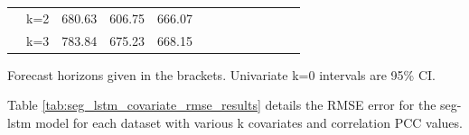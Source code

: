 \documentclass{article}
\begin{document}
\begin{table}[tbp]
\begin{threeparttable}
\begin{small}
\begin{tabular}{c|c|ccccccccccc}
    & k=2 & 680.63 & 606.75 & 666.07 \\ 
    & k=3 & 783.84 & 675.23 & 668.15 \\
    \bottomrule
  \end{tabular}
  \begin{tablenotes}
    \item Forecast horizons given in the brackets. Univariate k=0 intervals are 95\% CI.
  \end{tablenotes}
  \end{small}
  \end{threeparttable}
  \label{tab:base_lstm_covariate_rmse_results}
  \vspace{-15pt}
\end{table}


Table \ref{tab:seg_lstm_covariate_rmse_results} details
the RMSE error for the seg-lstm model for each dataset with various k covariates and correlation PCC values.  
\end{document}
